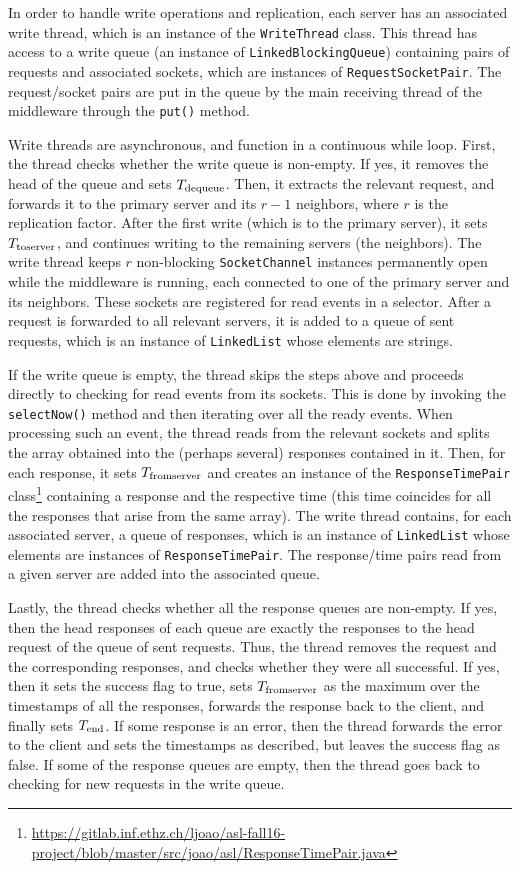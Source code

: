 \documentclass[11pt]{article}
\begin{document}
In order to handle write operations and replication, each server has an associated write thread, which is an instance of the \texttt{WriteThread} class. This thread has access to a write queue (an instance of \texttt{LinkedBlockingQueue}) containing pairs of requests and associated sockets, which are instances of \texttt{RequestSocketPair}. The request/socket pairs are put in the queue by the main receiving thread of the middleware through the \texttt{put()} method.

Write threads are asynchronous, and function in a continuous while loop. First, the thread checks whether the write queue is non-empty. If yes, it removes the head of the queue and sets $T_{\textnormal{dequeue}}$. Then, it extracts the relevant request, and forwards it to the primary server and its $r-1$ neighbors, where $r$ is the replication factor. After the first write (which is to the primary server), it sets $T_{\textnormal{toserver}}$, and continues writing to the remaining servers (the neighbors). The write thread keeps $r$ non-blocking \texttt{SocketChannel} instances permanently open while the middleware is running, each connected to one of the primary server and its neighbors. These sockets are registered for read events in a selector. After a request is forwarded to all relevant servers, it is added to a queue of sent requests, which is an instance of \texttt{LinkedList} whose elements are strings.

If the write queue is empty, the thread skips the steps above and proceeds directly to checking for read events from its sockets. This is done by invoking the \texttt{selectNow()} method and then iterating over all the ready events. When processing such an event, the thread reads from the relevant sockets and splits the array obtained into the (perhaps several) responses contained in it. Then, for each response, it sets $T_{\textnormal{fromserver}}$ and creates an instance of the \texttt{ResponseTimePair} class\footnote{\url{https://gitlab.inf.ethz.ch/ljoao/asl-fall16-project/blob/master/src/joao/asl/ResponseTimePair.java}} containing a response and the respective time (this time coincides for all the responses that arise from the same array). The write thread contains, for each associated server, a queue of responses, which is an instance of \texttt{LinkedList} whose elements are instances of \texttt{ResponseTimePair}. The response/time pairs read from a given server are added into the associated queue.

Lastly, the thread checks whether all the response queues are non-empty. If yes, then the head responses of each queue are exactly the responses to the head request of the queue of sent requests. Thus, the thread removes the request and the corresponding responses, and checks whether they were all successful. If yes, then it sets the success flag to true, sets $T_{\textnormal{fromserver}}$ as the maximum over the timestamps of all the responses, forwards the response back to the client, and finally sets $T_{\textnormal{end}}$. If some response is an error, then the thread forwards the error to the client and sets the timestamps as described, but leaves the success flag as false. If some of the response queues are empty, then the thread goes back to checking for new requests in the write queue.
\end{document}
